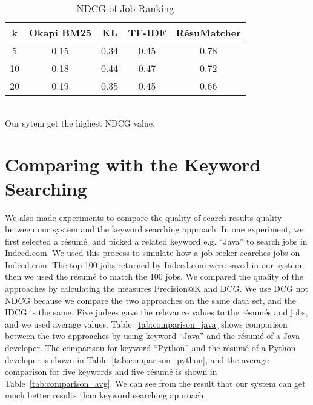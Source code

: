 \begin{table}[ht]
\caption{NDCG of Job Ranking } %
\centering %
\begin{tabular}{    | c | c | c | c | c |  }
 \hline
       k    & Okapi BM25 & KL    & TF-IDF &  R\'esuMatcher  \\
 \hline
       5    & 0.15       & 0.34  & 0.45     & 0.78   \\
 \hline
       10   & 0.18       & 0.44  & 0.47     & 0.72   \\
 \hline
       20   & 0.19       & 0.35  & 0.45     & 0.66   \\
 \hline

\end{tabular}
\label{tab:job_ndcg} %
\\Our sytem get the highest NDCG value.
\end{table}

\section{Comparing with the Keyword Searching}
We also made experiments to compare the quality of search results quality between our system and the keyword searching approach. In one experiment, we first selected a r\'esum\'e, and picked a related keyword e.g. ``Java''  to search jobs in Indeed.com. We used this process to simulate how a job seeker searches jobs on Indeed.com. The top 100 jobs returned by Indeed.com were saved in our system, then we used the r\'esum\'e to match the 100 jobs. We compared the quality of the approaches by calculating the measures Precision@K  and  DCG. We use DCG not NDCG because we compare the two approaches on the same data set, and the IDCG is the same. Five judges gave the relevance values to the r\'esum\'es and jobs, and we used average values. Table~\ref{tab:comparison_java} shows comparison between the two approaches by using keyword ``Java'' and the r\'esum\'e of a Java developer. The comparison for  keyword ``Python'' and the r\'esum\'e of a Python developer is shown in Table~\ref{tab:comparison_python}, and the average comparison for five keywords and five r\'esum\'e is shown in Table~\ref{tab:comparison_avg}. We can see from the result that our system can get much better results than keyword searching approach.

